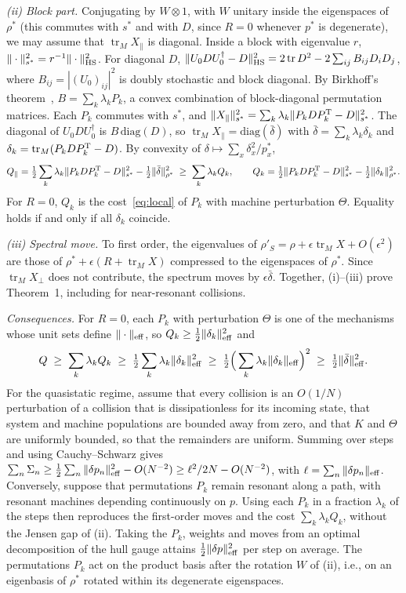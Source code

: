 \documentclass[aps,prl,reprint,superscriptaddress,amsmath,amssymb]{revtex4-2}
\newcommand{\Tr}{\operatorname{tr}}
\begin{document}
\emph{(ii) Block part.} Conjugating by $W\otimes1$, with $W$ unitary inside the eigenspaces of $\rho^*$ (this commutes
with $s^*$ and with $D$, since $R=0$ whenever $p^*$ is degenerate), we may assume that $\Tr_MX_\parallel$ is diagonal.
Inside a block with eigenvalue $r$, $\|\cdot\|^2_{s^*}=r^{-1}\|\cdot\|^2_{\rm HS}$. For diagonal $D$,
$\|U_0DU_0^\dagger-D\|^2_{\rm HS}=2\Tr D^2-2\sum_{ij}B_{ij}D_iD_j$, where $B_{ij}=|(U_0)_{ij}|^2$ is doubly stochastic and
block diagonal. By Birkhoff's theorem~\cite{Birkhoff1946}, $B=\sum_k\lambda_kP_k$, a convex combination of block-diagonal
permutation matrices. Each $P_k$ commutes with $s^*$, and
$\|X_\parallel\|^2_{s^*}=\sum_k\lambda_k\|P_kDP_k^{\rm T}-D\|^2_{s^*}$. The diagonal of $U_0DU_0^\dagger$ is
$B\,\mathrm{diag}(D)$, so $\Tr_MX_\parallel=\mathrm{diag}(\bar\delta)$ with $\bar\delta=\sum_k\lambda_k\delta_k$ and
$\delta_k=\Tr_M(P_kDP_k^{\rm T}-D)$. By convexity of $\delta\mapsto\sum_x\delta_x^2/p^*_x$,
\[
Q_\parallel=\tfrac12\sum_k\lambda_k\|P_kDP_k^{\rm T}-D\|^2_{s^*}-\tfrac12\|\bar\delta\|^2_{\rho^*}
\;\geq\;\sum_k\lambda_kQ_k,\qquad Q_k=\tfrac12\|P_kDP_k^{\rm T}-D\|^2_{s^*}-\tfrac12\|\delta_k\|^2_{\rho^*}.
\]
For $R=0$, $Q_k$ is the cost~\eqref{eq:local} of $P_k$ with machine perturbation $\Theta$. Equality holds if and only if
all $\delta_k$ coincide.

\emph{(iii) Spectral move.} To first order, the eigenvalues of $\rho'_S=\rho+\epsilon\Tr_MX+O(\epsilon^2)$ are those of
$\rho^*+\epsilon(R+\Tr_MX)$ compressed to the eigenspaces of $\rho^*$. Since $\Tr_MX_\perp$ does not contribute, the
spectrum moves by $\epsilon\bar\delta$. Together, (i)--(iii) prove Theorem~1, including for near-resonant collisions.

\emph{Consequences.} For $R=0$, each $P_k$ with perturbation $\Theta$ is one of the mechanisms whose unit sets define
$\|\cdot\|_{\rm eff}$, so $Q_k\geq\tfrac12\|\delta_k\|^2_{\rm eff}$ and
\[
Q\;\geq\;\sum_k\lambda_kQ_k\;\geq\;\tfrac12\sum_k\lambda_k\|\delta_k\|_{\rm eff}^2\;\geq\;\tfrac12\Big(\sum_k\lambda_k\|\delta_k\|_{\rm eff}\Big)^2\;\geq\;\tfrac12\|\bar\delta\|^2_{\rm eff}.
\]
For the quasistatic regime, assume that every collision is an $O(1/N)$ perturbation of a collision that is
dissipationless for its incoming state, that system and machine populations are bounded away from zero, and that $K$
and $\Theta$ are uniformly bounded, so that the remainders are uniform. Summing over steps and using Cauchy--Schwarz
gives $\sum_n\Sigma_n\geq\tfrac12\sum_n\|\delta p_n\|^2_{\rm eff}-O(N^{-2})\geq\ell^2/2N-O(N^{-2})$, with
$\ell=\sum_n\|\delta p_n\|_{\rm eff}$. Conversely, suppose that permutations $P_k$ remain resonant along a path, with
resonant machines depending continuously on $p$. Using each $P_k$ in a fraction $\lambda_k$ of the steps then reproduces
the first-order moves and the cost $\sum_k\lambda_kQ_k$, without the Jensen gap of (ii). Taking the $P_k$, weights and
moves from an optimal decomposition of the hull gauge attains $\tfrac12\|\delta p\|^2_{\rm eff}$ per step on average.
The permutations $P_k$ act on the product basis after the rotation $W$ of (ii), i.e., on an eigenbasis of $\rho^*$
rotated within its degenerate eigenspaces.
\end{document}
